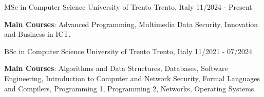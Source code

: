 
\begin{cventries}

	\cventry
	{MSc in Computer Science} %
	{University of Trento} %
	{Trento, Italy} %
	{11/2024 - Present} %
	{
		\begin{cvitems} %
			\item \textbf{Main Courses}: Advanced Programming, Multimedia Data Security, Innovation and Business in ICT.
		\end{cvitems}
	}


	\cventry
	{BSc in Computer Science} %
	{University of Trento} %
	{Trento, Italy} %
	{11/2021 - 07/2024} %
	{
		\begin{cvitems} %
			\item \textbf{Main Courses}: Algorithms and Data Structures, Databases, Software Engineering, Introduction to Computer and Network Security, Formal Languages and Compilers, Programming 1, Programming 2, Networks, Operating Systems.
		\end{cvitems}
	}

\end{cventries}
